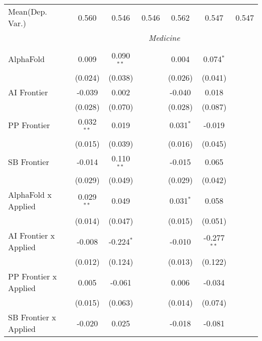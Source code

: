 \begin{tabular}{lcccccc}
Mean(Dep. Var.) & 0.560 & 0.546 & 0.546 & 0.562 & 0.547 & 0.547 \\
 & \multicolumn{6}{c}{\textit{Medicine}} \\ \\
   AlphaFold                      & 0.009        & 0.090$^{**}$ &                & 0.004       & 0.074$^{*}$   &   \\   
                                  & (0.024)      & (0.038)      &                & (0.026)     & (0.041)       &   \\   
   AI Frontier                    & -0.039       & 0.002        &                & -0.040      & 0.018         &   \\   
                                  & (0.028)      & (0.070)      &                & (0.028)     & (0.087)       &   \\   
   PP Frontier                    & 0.032$^{**}$ & 0.019        &                & 0.031$^{*}$ & -0.019        &   \\   
                                  & (0.015)      & (0.039)      &                & (0.016)     & (0.045)       &   \\   
   SB Frontier                    & -0.014       & 0.110$^{**}$ &                & -0.015      & 0.065         &   \\   
                                  & (0.029)      & (0.049)      &                & (0.029)     & (0.042)       &   \\   
   AlphaFold x Applied            & 0.029$^{**}$ & 0.049        &                & 0.031$^{*}$ & 0.058         &   \\   
                                  & (0.014)      & (0.047)      &                & (0.015)     & (0.051)       &   \\   
   AI Frontier x Applied          & -0.008       & -0.224$^{*}$ &                & -0.010      & -0.277$^{**}$ &   \\   
                                  & (0.012)      & (0.124)      &                & (0.013)     & (0.122)       &   \\   
   PP Frontier x Applied          & 0.005        & -0.061       &                & 0.006       & -0.034        &   \\   
                                  & (0.015)      & (0.063)      &                & (0.014)     & (0.074)       &   \\   
   SB Frontier x Applied          & -0.020       & 0.025        &                & -0.018      & -0.081        &   \\   

\end{tabular}

